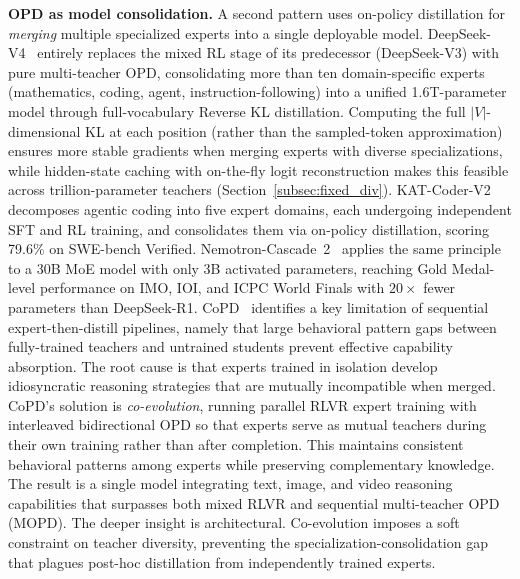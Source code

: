 \documentclass{article} %
\begin{document}
\textbf{OPD as model consolidation.} A second pattern uses on-policy distillation for \emph{merging} multiple specialized experts into a single deployable model. DeepSeek-V4~\citep{deepseekv4} entirely replaces the mixed RL stage of its predecessor (DeepSeek-V3) with pure multi-teacher OPD, consolidating more than ten domain-specific experts (mathematics, coding, agent, instruction-following) into a unified 1.6T-parameter model through full-vocabulary Reverse KL distillation. Computing the full $|V|$-dimensional KL at each position (rather than the sampled-token approximation) ensures more stable gradients when merging experts with diverse specializations, while hidden-state caching with on-the-fly logit reconstruction makes this feasible across trillion-parameter teachers (Section~\ref{subsec:fixed_div}). KAT-Coder-V2~\citep{2603.27703} decomposes agentic coding into five expert domains, each undergoing independent SFT and RL training, and consolidates them via on-policy distillation, scoring 79.6\% on SWE-bench Verified. Nemotron-Cascade~2~\citep{2603.19220} applies the same principle to a 30B MoE model with only 3B activated parameters, reaching Gold Medal-level performance on IMO, IOI, and ICPC World Finals with $20\times$ fewer parameters than DeepSeek-R1. CoPD~\citep{2604.27083} identifies a key limitation of sequential expert-then-distill pipelines, namely that large behavioral pattern gaps between fully-trained teachers and untrained students prevent effective capability absorption. The root cause is that experts trained in isolation develop idiosyncratic reasoning strategies that are mutually incompatible when merged. CoPD's solution is \emph{co-evolution}, running parallel RLVR expert training with interleaved bidirectional OPD so that experts serve as mutual teachers during their own training rather than after completion. This maintains consistent behavioral patterns among experts while preserving complementary knowledge. The result is a single model integrating text, image, and video reasoning capabilities that surpasses both mixed RLVR and sequential multi-teacher OPD (MOPD). The deeper insight is architectural. Co-evolution imposes a soft constraint on teacher diversity, preventing the specialization-consolidation gap that plagues post-hoc distillation from independently trained experts.
\end{document}
